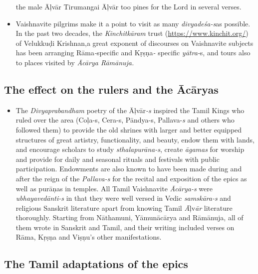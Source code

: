 \begin{itemize}
the male Āļvār Tirumangai Āļvār too pines for the Lord in several verses.

 \item Vaishnavite pilgrims make it a point to visit as many \textit{divyadeśa-s}\break as possible. In the past two decades, the \textit{Kinchitkāram} trust (\url{https://www.kinchit.org/}) of Velukkuḍi Krishnan,a great exponent of discourses on Vaishnavite subjects has been arranging Rāma\textit{-}specific and Kṛṣṇa\textit{-} specific \textit{yātra-}s, and tours also to places visited by \textit{Ācārya Rāmānuja.}

\end{itemize}


\subsection*{The effect on the rulers and the Ācāryas}

\begin{itemize}
\item The \textit{Divyaprabandham} poetry of the Āļvār\textit{-s} inspired the Tamil Kings who ruled over the area (Coļa-s, Cera-s, Pāndya-s, Pallava-\textit{s} and others who followed them) to provide the old shrines with larger and better equipped structures of great artistry, functionality, and beauty, endow them with lands, and encourage scholars to study \textit{sthalapurāna-s}, create \textit{āgamas} for worship and provide for daily and seasonal rituals and festivals with public participation. Endowments are also known to have been made during and after the reign of the \textit{Pallava-s} for the recital and exposition of the epics as well as purāņas in temples. All Tamil Vaishnavite \textit{Ācārya-s} were \textit{ubhayavedānti-s} in that they were well versed in Vedic \textit{samskāra-s} and religious Sanskrit literature apart from knowing Tamil \textit{Ā}ļv\textit{ār} literature thoroughly. Starting from Nāthamuni, Yāmunācārya and Rāmānuja, all of them wrote in Sanskrit and Tamil, and their writing included verses on Rāma, Kṛṣṇa and Viṣṇu’s other manifestations.

\end{itemize}


\subsection*{The Tamil adaptations of the epics}

